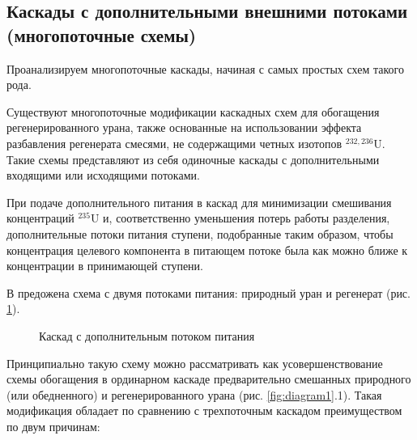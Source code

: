 \subsection{Каскады с дополнительными внешними потоками (многопоточные схемы)}

Проанализируем многопоточные каскады, начиная с самых простых схем такого рода.

Существуют многопоточные модификации каскадных схем для обогащения регенерированного урана, также основанные на использовании эффекта разбавления регенерата смесями, не содержащими четных изотопов $^{232,236}$U. Такие схемы представляют из себя одиночные каскады с дополнительными входящими или исходящими потоками.

При подаче дополнительного питания в каскад для минимизации смешивания концентраций $^{235}$U и, соответственно уменьшения потерь работы разделения, дополнительные потоки питания ступени, подобранные таким образом, чтобы концентрация целевого компонента в питающем потоке была как можно ближе к концентрации в принимающей ступени. 

В \cite{sulaberidzeQuasiidealCascadesAdditional2006} предожена схема с двумя потоками питания: природный уран и регенерат (рис. \ref{fig:2_inputs}).
\begin{figure}[ht]
  \caption{Каскад с дополнительным потоком питания}\label{fig:2_inputs}
\end{figure}

Принципиально такую схему можно рассматривать как усовершенствование схемы обогащения в ординарном каскаде предварительно смешанных природного (или обедненного) и регенерированного урана (рис. \ref{fig:diagram1}.1). Такая модификация обладает по сравнению с трехпоточным каскадом преимуществом по двум причинам:

